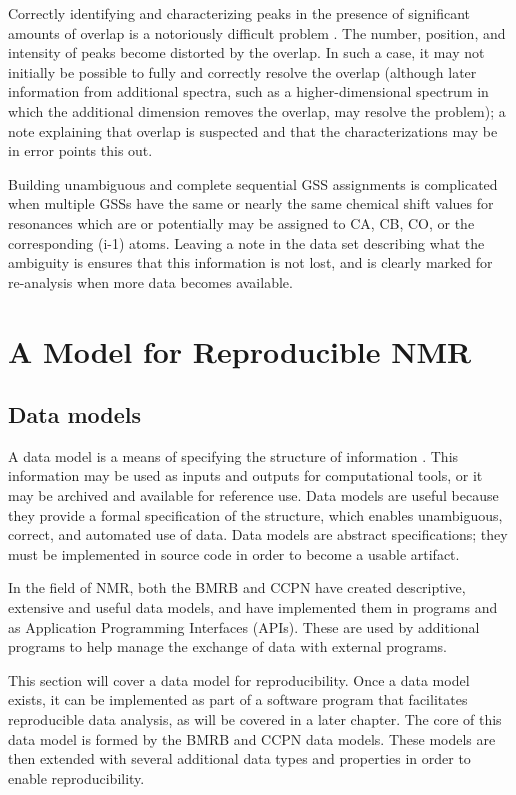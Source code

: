 Correctly identifying and characterizing peaks in the presence of significant
amounts of overlap is a notoriously difficult problem \cite{guerry2011automated}.
The number, position, and intensity of peaks become distorted by the overlap.
In such a case, it may not initially be possible to fully and correctly
resolve the overlap (although later information from additional spectra, such
as a higher-dimensional spectrum in which the additional dimension removes
the overlap, may resolve the problem); a note explaining that overlap is
suspected and that the characterizations may be in error points this out.

Building unambiguous and complete sequential GSS assignments is complicated 
when multiple GSSs have the same or nearly the same chemical shift values
for resonances which are or potentially may be assigned to CA, CB, CO, or the
corresponding (i-1) atoms.  Leaving a note in the data set describing what
the ambiguity is ensures that this information is not lost, and is clearly
marked for re-analysis when more data becomes available.


\section{A Model for Reproducible NMR}

\subsection{Data models}
A data model is a means of specifying the structure of information  
\cite{codd1970relational}.  This
information may be used as inputs and outputs for computational tools, or
it may be archived and available for reference use.  Data models are useful
because they provide a formal specification of the structure, which enables
unambiguous, correct, and automated use of data.  Data models are
abstract specifications; they must be implemented in source code in order
to become a usable artifact.

In the field of NMR, both the BMRB \cite{bmrb} and CCPN \cite{ccpn} have
created descriptive, extensive and useful data models, and have implemented them 
in programs and as Application Programming Interfaces (APIs).  These are used
by additional programs to help manage the exchange of data with external
programs.

This section will cover a data model for reproducibility.  Once a data
model exists, it can be implemented as part of a software program that
facilitates reproducible data analysis, as will be covered in a later 
chapter.  The core of this data model is formed by the BMRB \cite{bmrb}
and CCPN \cite{ccpn} data models.  These models are then extended with
several additional data types and properties in order to enable 
reproducibility.

